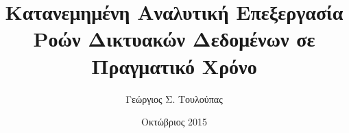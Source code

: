 \documentclass[diploma]{softlab-thesis}
\begin{document}

\frontmatter

\title{Κατανεμημένη Αναλυτική Επεξεργασία Ροών Δικτυακών Δεδομένων σε Πραγματικό Χρόνο}
\author{Γεώργιος Σ. Τουλούπας}
\date{Οκτώβριος 2015}



\maketitle















\renewcommand{\contentsname}{Contents}
\renewcommand{\listtablename}{List of Tables}
\renewcommand{\listfigurename}{List of Figures}

\tableofcontents
\listoftables
\listoffigures



\mainmatter

\renewcommand{\chaptername}{Chapter}
\renewcommand{\figurename}{Figure}
\renewcommand{\tablename}{Table}
\renewcommand{\pagesname}{Pages}
\renewcommand{\refname}{References}
\renewcommand{\bibname}{Bibliography}
\renewcommand{\indexname}{Index}
\renewcommand{\appendixname}{Appendix}

\begin{english}






\end{english}





\end{document}
